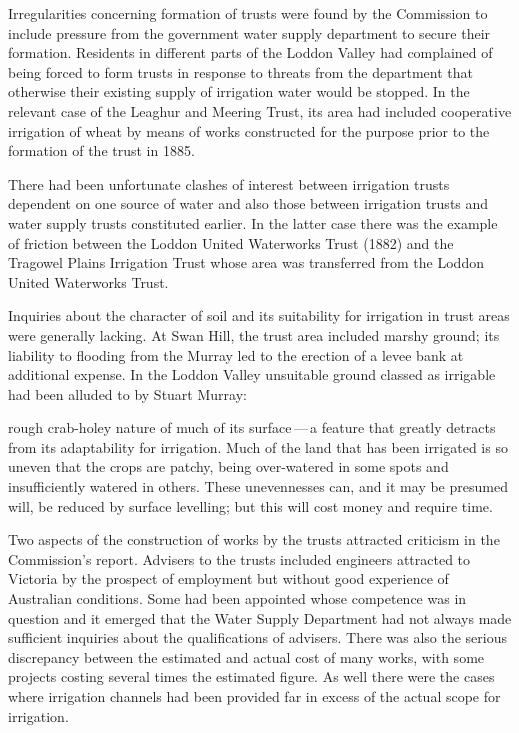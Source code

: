 Irregularities concerning formation of trusts were found by the
Commission to include pressure from the government water supply
department to secure their formation.  Residents in different parts of
the Loddon Valley  had complained of being forced
to form trusts in response to threats from the department that
otherwise their existing supply of irrigation water would be stopped.
In the relevant case of the Leaghur and Meering Trust,
 its area had included
cooperative irrigation of wheat by means of works
constructed for the purpose prior to the formation of the trust in
1885.

There had been unfortunate clashes of interest between irrigation
trusts dependent on one source of water and also those between
irrigation trusts and water supply trusts constituted earlier.  In the
latter case there was the example of friction between the Loddon
United Waterworks Trust  (1882)
and the Tragowel Plains Irrigation Trust
 whose area was transferred
from the Loddon United Waterworks Trust.

Inquiries about the character of soil and its suitability for
irrigation in trust areas were generally lacking.  At Swan Hill,
 the trust area included marshy ground; its
liability to flooding from the Murray led to the erection of a levee
bank at additional expense.  In the Loddon Valley unsuitable ground
classed as irrigable had been alluded to by Stuart Murray:
\begin{Quote}
	rough crab-holey nature of much of its surface\,---\,a feature
	that greatly detracts from its adaptability for irrigation.
	Much of the land that has been irrigated is so uneven that the
	crops are patchy, being over-watered in some spots and
	insufficiently watered in others.  These unevennesses can, and
	it may be presumed will, be reduced by surface levelling; but
	this will cost money and require time.
\end{Quote}

Two aspects of the construction of works by the trusts attracted
criticism in the Commission's report.  Advisers to the trusts included
engineers attracted to Victoria by the prospect of employment but
without good experience of Australian conditions.  Some had been
appointed whose competence was in question and it emerged that the
Water Supply Department had not always made sufficient inquiries about
the qualifications of advisers.  There was also the serious
discrepancy between the estimated and actual cost of many works, with
some projects costing several times the estimated figure.  As well
there were the cases where irrigation
channels had been provided far in excess of
the actual scope for irrigation.

